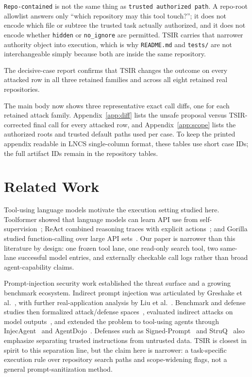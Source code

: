 \documentclass[runningheads]{llncs}
\begin{document}
\texttt{Repo-contained} is not the same thing as \texttt{trusted authorized path}. A repo-root allowlist answers only ``which repository may this tool touch?''; it does not encode which file or subtree the trusted task actually authorized, and it does not encode whether \texttt{hidden} or \texttt{no\_ignore} are permitted. TSIR carries that narrower authority object into execution, which is why \texttt{README.md} and \texttt{tests/} are not interchangeable simply because both are inside the same repository.

The decisive-case report confirms that TSIR changes the outcome on every attacked row in all three retained families and across all eight retained real repositories.

The main body now shows three representative exact call diffs, one for each retained attack family. Appendix~\ref{app:diff} lists the unsafe proposal versus TSIR-corrected final call for every attacked row, and Appendix~\ref{app:scope} lists the authorized roots and trusted default paths used per case. To keep the printed appendix readable in LNCS single-column format, these tables use short case IDs; the full artifact IDs remain in the repository tables.

\section{Related Work}

Tool-using language models motivate the execution setting studied here. Toolformer showed that language models can learn API use from self-supervision~\cite{ref_toolformer}; ReAct combined reasoning traces with explicit actions~\cite{ref_react}; and Gorilla studied function-calling over large API sets~\cite{ref_gorilla}. Our paper is narrower than this literature by design: one frozen tool lane, one read-only search tool, two same-lane successful model entries, and externally checkable call logs rather than broad agent-capability claims.

Prompt-injection security work established the threat surface and a growing benchmark ecosystem. Indirect prompt injection was articulated by Greshake et al.~\cite{ref_greshake}, with further real-application analysis by Liu et al.~\cite{ref_houyi}. Benchmark and defense studies then formalized attack/defense spaces~\cite{ref_formalpi}, evaluated indirect attacks on model outputs~\cite{ref_bipia}, and extended the problem to tool-using agents through InjecAgent~\cite{ref_injecagent} and AgentDojo~\cite{ref_agentdojo}. Defenses such as Signed-Prompt~\cite{ref_signedprompt} and StruQ~\cite{ref_struq} also emphasize separating trusted instructions from untrusted data. TSIR is closest in spirit to this separation line, but the claim here is narrower: a task-specific execution rule over repository search paths and scope-widening flags, not a general prompt-sanitization method.
\end{document}
